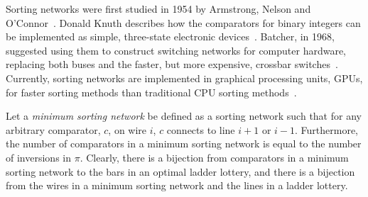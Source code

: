 Sorting networks were first studied in 1954 by Armstrong, Nelson and O'Connor~\cite{A18}. 
Donald Knuth describes how the comparators for binary integers can be implemented as simple, 
three-state electronic devices~\cite{A18}. Batcher, in 1968, 
suggested using them to construct switching networks for computer hardware, replacing 
both buses and the faster, but more expensive, crossbar switches~\cite{A27}. Currently, sorting networks 
are implemented in graphical processing units, GPUs, for faster sorting methods than traditional CPU sorting methods~\cite{A28}.\par  
Let a \emph{minimum sorting network} be defined 
as a sorting network such that for any arbitrary comparator, $c$, on wire $i$, $c$ connects to line $i+1$ or $i-1$. Furthermore, 
the number of comparators in a minimum sorting network is equal to the number of inversions in $\pi$. Clearly, there is a 
bijection from comparators in a minimum sorting network to the bars in an optimal ladder lottery, and there 
is a bijection from the wires in a minimum sorting network and the lines in a ladder lottery. 


 
